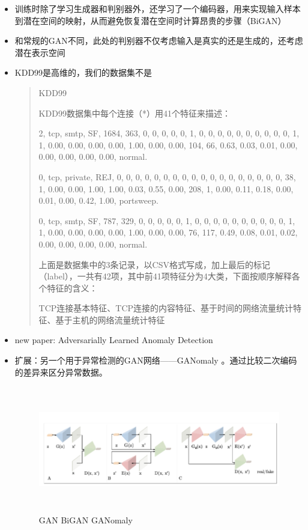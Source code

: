 \documentclass[12pt]{article}
\begin{document}
\begin{itemize}
\item
  训练时除了学习生成器和判别器外，还学习了一个编码器，用来实现输入样本到潜在空间的映射，从而避免恢复潜在空间时计算昂贵的步骤（BiGAN）
\item
  和常规的GAN不同，此处的判别器不仅考虑输入是真实的还是生成的，还考虑潜在表示空间
\item
  KDD99是高维的，我们的数据集不是

  \begin{quote}
  KDD99

  KDD99数据集中每个连接（*）用41个特征来描述：

  2, tcp, smtp, SF, 1684, 363, 0, 0, 0, 0, 0, 1, 0, 0, 0, 0, 0, 0, 0, 0,
  0, 0, 1, 1, 0.00, 0.00, 0.00, 0.00, 1.00, 0.00, 0.00, 104, 66, 0.63,
  0.03, 0.01, 0.00, 0.00, 0.00, 0.00, 0.00, normal.

  0, tcp, private, REJ, 0, 0, 0, 0, 0, 0, 0, 0, 0, 0, 0, 0, 0, 0, 0, 0,
  0, 0, 38, 1, 0.00, 0.00, 1.00, 1.00, 0.03, 0.55, 0.00, 208, 1, 0.00,
  0.11, 0.18, 0.00, 0.01, 0.00, 0.42, 1.00, portsweep.

  0, tcp, smtp, SF, 787, 329, 0, 0, 0, 0, 0, 1, 0, 0, 0, 0, 0, 0, 0, 0,
  0, 0, 1, 1, 0.00, 0.00, 0.00, 0.00, 1.00, 0.00, 0.00, 76, 117, 0.49,
  0.08, 0.01, 0.02, 0.00, 0.00, 0.00, 0.00, normal.

  上面是数据集中的3条记录，以CSV格式写成，加上最后的标记（label），一共有42项，其中前41项特征分为4大类，下面按顺序解释各个特征的含义：

  TCP连接基本特征、TCP连接的内容特征、基于时间的网络流量统计特征、基于主机的网络流量统计特征
  \end{quote}
\item
  new paper: Adversarially Learned Anomaly Detection
\item
  扩展：另一个用于异常检测的GAN网络------GANomaly
  。通过比较二次编码的差异来区分异常数据。

  \begin{figure}[htbp]
  \centering
  \includegraphics[height=5.5cm,width=12cm]{Report2-figure/image-20191001145242390.png}
  \caption{GAN BiGAN GANomaly}
  \end{figure}
\end{itemize}
\end{document}
